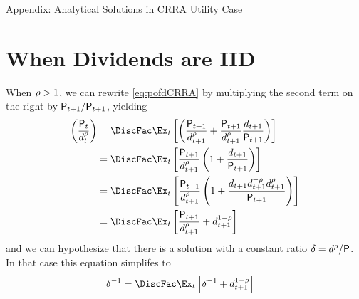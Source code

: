 \documentclass{\handout}
\begin{document}
\pagebreak
\appendix {} %

\appendix
\centerline{\Large Appendix:  Analytical Solutions in CRRA Utility Case}

\medskip\medskip\medskip

\hypertarget{when-dividends-are-IID}{}
\section{When Dividends are IID}
\newcommand{\dCRRAoverP}{\delta}
\newcommand{\PoverdCRRA}{\delta^{-1}}

When $\rho > 1$, we can rewrite \eqref{eq:pofdCRRA} by multiplying the second term on the right by $\mathsf{P}_{t+1}/\mathsf{P}_{t+1}$, yielding
\begin{equation}\begin{gathered}\begin{aligned}
      \left(\frac{\Price_{t}}{\dvdnd_{t}^{\CRRA}}\right) & =  \DiscFac \Ex_{t}\left[\left(\frac{\Price_{t+1}}{\dvdnd_{t+1}^{\CRRA}}+\frac{\Price_{t+1}}{\dvdnd_{t+1}^{\CRRA}}\frac{\dvdnd_{t+1}}{\Price_{t+1}}\right)\right] \label{eq:PoverdCRRA}
      \\ & =  \DiscFac \Ex_{t}\left[\frac{\Price_{t+1}}{\dvdnd_{t+1}^{\CRRA}}\left(1+\frac{\dvdnd_{t+1}}{\Price_{t+1}}\right)\right]
      \\ & =  \DiscFac \Ex_{t}\left[\frac{\Price_{t+1}}{\dvdnd_{t+1}^{\CRRA}}\left(1+\frac{\dvdnd_{t+1}\dvdnd_{t+1}^{-\CRRA}\dvdnd_{t+1}^{\CRRA}}{\Price_{t+1}}\right)\right]       
      \\ & =  \DiscFac \Ex_{t}\left[\frac{\Price_{t+1}}{\dvdnd_{t+1}^{\CRRA}}+\dvdnd_{t+1}^{1-\CRRA}\right]
    \end{aligned}\end{gathered}\end{equation}
and we can hypothesize that there is a solution with a constant ratio $\dCRRAoverP=\dvdnd^{\CRRA}/\Price$.  In that case this equation simplifes to 
\begin{equation}\begin{gathered}\begin{aligned}
      \PoverdCRRA & =  \DiscFac \Ex_{t}\left[\PoverdCRRA+\dvdnd_{t+1}^{1-\CRRA}\right]     \label{eq:recursive}
    \end{aligned}\end{gathered}\end{equation}
\end{document}
